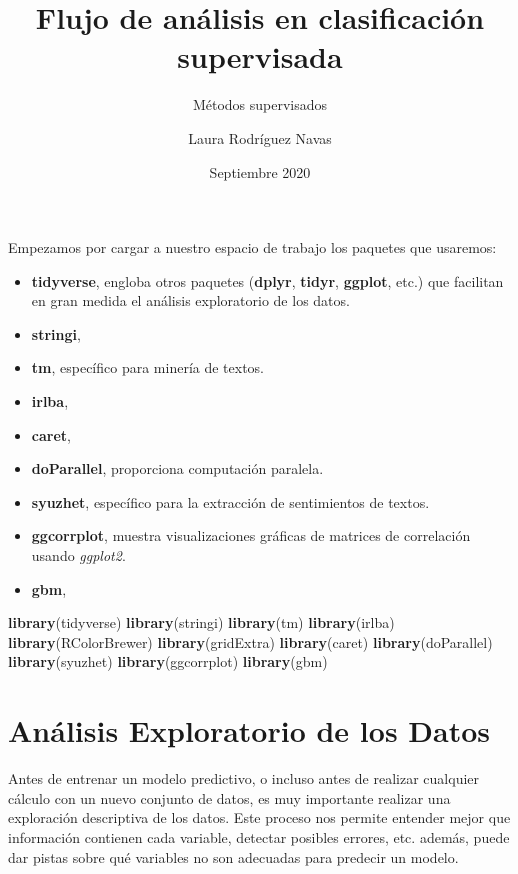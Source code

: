 \documentclass[]{article}
\title{Flujo de análisis en clasificación supervisada}
\subtitle{Métodos supervisados}
\author{Laura Rodríguez Navas}
\date{Septiembre 2020}
\newenvironment{Shaded}{\begin{snugshade}}{\end{snugshade}}
\newcommand{\KeywordTok}[1]{\textcolor[rgb]{0.13,0.29,0.53}{\textbf{#1}}}
\newcommand{\NormalTok}[1]{#1}
\providecommand{\tightlist}{%
  \setlength{\itemsep}{0pt}\setlength{\parskip}{0pt}}
\begin{document}
\maketitle

{
\setcounter{tocdepth}{2}
\tableofcontents
}
Empezamos por cargar a nuestro espacio de trabajo los paquetes que
usaremos:

\begin{itemize}
\tightlist
\item
  \textbf{tidyverse}, engloba otros paquetes (\textbf{dplyr},
  \textbf{tidyr}, \textbf{ggplot}, etc.) que facilitan en gran medida el
  análisis exploratorio de los datos.
\item
  \textbf{stringi},
\item
  \textbf{tm}, específico para minería de textos.
\item
  \textbf{irlba},
\item
  \textbf{caret},
\item
  \textbf{doParallel}, proporciona computación paralela.
\item
  \textbf{syuzhet}, específico para la extracción de sentimientos de
  textos.
\item
  \textbf{ggcorrplot}, muestra visualizaciones gráficas de matrices de
  correlación usando \emph{ggplot2}.
\item
  \textbf{gbm},
\end{itemize}

\begin{Shaded}
\begin{Highlighting}[]
\KeywordTok{library}\NormalTok{(tidyverse)}
\KeywordTok{library}\NormalTok{(stringi)}
\KeywordTok{library}\NormalTok{(tm)}
\KeywordTok{library}\NormalTok{(irlba)}
\KeywordTok{library}\NormalTok{(RColorBrewer)}
\KeywordTok{library}\NormalTok{(gridExtra)}
\KeywordTok{library}\NormalTok{(caret)}
\KeywordTok{library}\NormalTok{(doParallel)}
\KeywordTok{library}\NormalTok{(syuzhet)}
\KeywordTok{library}\NormalTok{(ggcorrplot)}
\KeywordTok{library}\NormalTok{(gbm)}
\end{Highlighting}
\end{Shaded}

\hypertarget{anuxe1lisis-exploratorio-de-los-datos}{%
\section{Análisis Exploratorio de los
Datos}\label{anuxe1lisis-exploratorio-de-los-datos}}

Antes de entrenar un modelo predictivo, o incluso antes de realizar
cualquier cálculo con un nuevo conjunto de datos, es muy importante
realizar una exploración descriptiva de los datos. Este proceso nos
permite entender mejor que información contienen cada variable, detectar
posibles errores, etc. además, puede dar pistas sobre qué variables no
son adecuadas para predecir un modelo.
\end{document}
